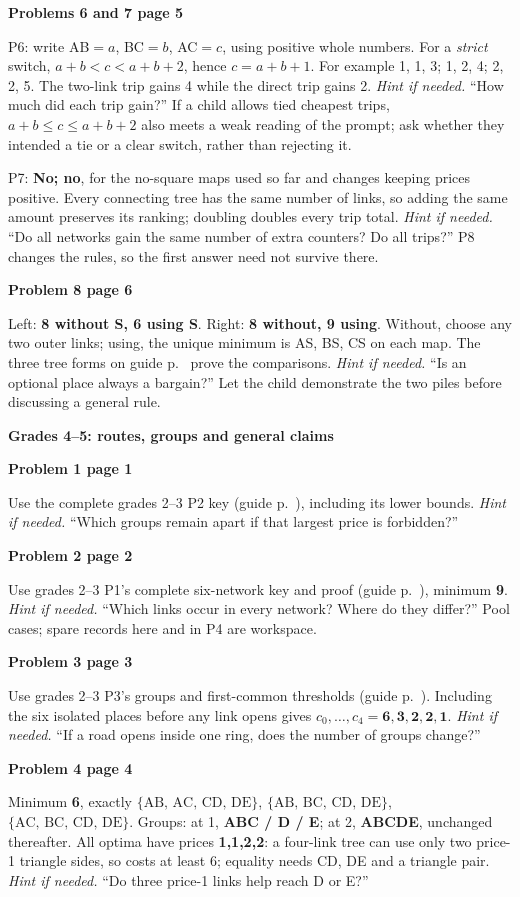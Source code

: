 \documentclass[11pt]{article}
\newcommand{\head}[1]{\par{\large\bfseries #1}\par\nobreak}
\newcommand{\sub}[1]{\par\textbf{#1}\par\nobreak}
\newcommand{\hint}[1]{\textit{Hint if needed.} #1}
\newcommand{\links}[1]{\ensuremath{\{\text{#1}\}}}
\begin{document}
\sub{Problems 6 and 7 page 5}
P6: write AB$=a$, BC$=b$, AC$=c$, using positive whole numbers. For a \emph{strict} switch, $a+b<c<a+b+2$, hence \textbf{$c=a+b+1$}. For example 1, 1, 3; 1, 2, 4; 2, 2, 5. The two-link trip gains 4 while the direct trip gains 2. \hint{``How much did each trip gain?''} If a child allows tied cheapest trips, $a+b\le c\le a+b+2$ also meets a weak reading of the prompt; ask whether they intended a tie or a clear switch, rather than rejecting it.

P7: \textbf{No; no}, for the no-square maps used so far and changes keeping prices positive. Every connecting tree has the same number of links, so adding the same amount preserves its ranking; doubling doubles every trip total. \hint{``Do all networks gain the same number of extra counters? Do all trips?''} P8 changes the rules, so the first answer need not survive there.

\sub{Problem 8 page 6}
Left: \textbf{8 without S, 6 using S}. Right: \textbf{8 without, 9 using}. Without, choose any two outer links; using, the unique minimum is AS, BS, CS on each map. The three tree forms on guide p.~\pageref{starforms} prove the comparisons. \hint{``Is an optional place always a bargain?''} Let the child demonstrate the two piles before discussing a general rule.
\bigskip
\head{Grades 4--5: routes, groups and general claims}
\sub{Problem 1 page 1}
Use the complete grades 2--3 P2 key (guide p.~\pageref{routes-groups}), including its lower bounds. \hint{``Which groups remain apart if that largest price is forbidden?''}

\sub{Problem 2 page 2}
Use grades 2--3 P1's complete six-network key and proof (guide p.~\pageref{six-networks}), minimum \textbf{9}. \hint{``Which links occur in every network? Where do they differ?''} Pool cases; spare records here and in P4 are workspace.

\sub{Problem 3 page 3}
Use grades 2--3 P3's groups and first-common thresholds (guide p.~\pageref{routes-groups}). Including the six isolated places before any link opens gives $c_0,\ldots,c_4=\mathbf{6,3,2,2,1}$. \hint{``If a road opens inside one ring, does the number of groups change?''}

\sub{Problem 4 page 4}
Minimum \textbf{6}, exactly \links{AB, AC, CD, DE}, \links{AB, BC, CD, DE}, \links{AC, BC, CD, DE}. Groups: at 1, \textbf{ABC / D / E}; at 2, \textbf{ABCDE}, unchanged thereafter. All optima have prices \textbf{1,1,2,2}: a four-link tree can use only two price-1 triangle sides, so costs at least 6; equality needs CD, DE and a triangle pair. \hint{``Do three price-1 links help reach D or E?''}
\end{document}
